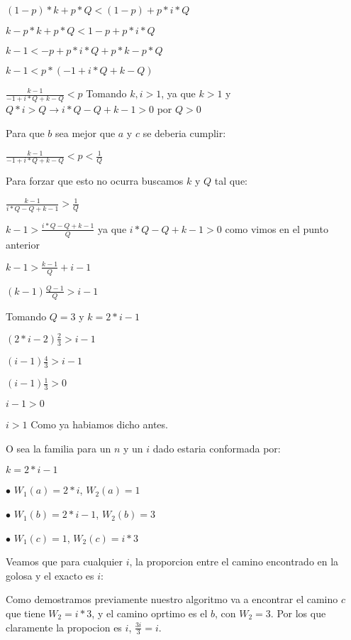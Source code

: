 $(1-p)*k+p*Q < (1-p)+p*i*Q$

$k-p*k+p*Q < 1-p+p*i*Q$

$k-1 < -p+p*i*Q+p*k-p*Q$

$k-1 < p*(-1+i*Q+k-Q)$

$\frac{k-1}{-1+i*Q+k-Q} < p$ Tomando $k,i > 1$, ya que $k > 1$ y $Q*i > Q \rightarrow i*Q-Q+k-1 > 0$ por $Q > 0$

Para que $b$ sea mejor que $a$ y $c$ se deberia cumplir:

$\frac{k-1}{-1+i*Q+k-Q} < p < \frac{1}{Q}$

Para forzar que esto no ocurra buscamos $k$ y $Q$ tal que:

$\frac{k-1}{i*Q-Q+k-1} > \frac{1}{Q}$

$k-1 > \frac{i*Q-Q+k-1}{Q}$ ya que $i*Q-Q+k-1 > 0$ como vimos en el punto anterior

$k-1 > \frac{k-1}{Q}+i-1$

$(k-1) \frac{Q-1}{Q} > i-1$

Tomando $Q=3$ y $k=2*i-1$

$(2*i-2) \frac{2}{3} > i-1$

$(i-1) \frac{4}{3} > i-1$

$(i-1) \frac{1}{3} > 0$

$i-1 > 0$

$i > 1$ Como ya habiamos dicho antes.


O sea la familia para un $n$ y un $i$ dado estaria conformada por:

$k = 2*i-1$

$\bullet$ $W_1(a) = 2*i$, $W_2(a)=1$

$\bullet$ $W_1(b) = 2*i-1$, $W_2(b)=3$

$\bullet$ $W_1(c) = 1$, $W_2(c)=i*3$

Veamos que para cualquier $i$, la proporcion entre el camino encontrado en la golosa y el exacto es $i$:

Como demostramos previamente nuestro algoritmo va a encontrar el camino $c$ que tiene $W_2=i*3$, y el camino oprtimo es el $b$, con $W_2=3$. Por los que claramente la propocion es $i$, $\frac{3i}{3}=i$.